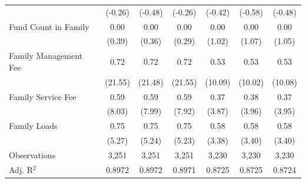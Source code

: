 {\begin{tabular}{l*{6}{c}}
                    &     (-0.26)         &     (-0.48)         &     (-0.26)         &     (-0.42)         &     (-0.58)         &     (-0.48)         \\
\addlinespace
Fund Count in Family&        0.00         &        0.00         &        0.00         &        0.00         &        0.00         &        0.00         \\
                    &      (0.39)         &      (0.36)         &      (0.29)         &      (1.02)         &      (1.07)         &      (1.05)         \\
\addlinespace
Family Management Fee&        0.72\sym{***}&        0.72\sym{***}&        0.72\sym{***}&        0.53\sym{***}&        0.53\sym{***}&        0.53\sym{***}\\
                    &     (21.55)         &     (21.48)         &     (21.55)         &     (10.09)         &     (10.02)         &     (10.08)         \\
\addlinespace
Family Service Fee  &        0.59\sym{***}&        0.59\sym{***}&        0.59\sym{***}&        0.37\sym{***}&        0.38\sym{***}&        0.37\sym{***}\\
                    &      (8.03)         &      (7.99)         &      (7.92)         &      (3.87)         &      (3.96)         &      (3.95)         \\
\addlinespace
Family Loads        &        0.75\sym{***}&        0.75\sym{***}&        0.75\sym{***}&        0.58\sym{***}&        0.58\sym{***}&        0.58\sym{***}\\
                    &      (5.27)         &      (5.24)         &      (5.23)         &      (3.38)         &      (3.40)         &      (3.40)         \\
\midrule
Observations        &       3,251         &       3,251         &       3,251         &       3,230         &       3,230         &       3,230         \\
Adj. R$^{2}$        &      0.8972         &      0.8972         &      0.8971         &      0.8725         &      0.8725         &      0.8724         \\
\bottomrule
\end{tabular}
}
